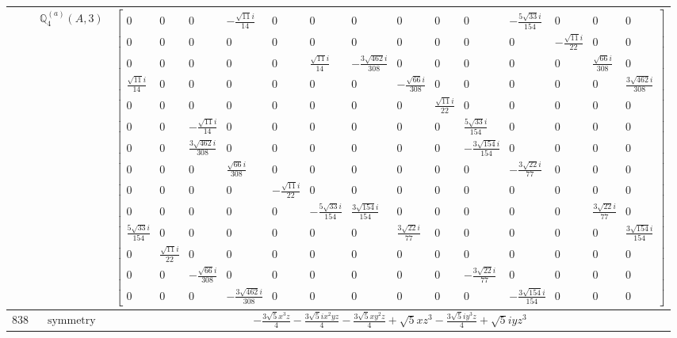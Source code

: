 \documentclass[fleqn,8pt,landscape]{jsarticle}
\begin{document}
\begin{longtable}{ccc}
$  $ & $ \mathbb{Q}_{4}^{(a)}(A,3) $ & $ \begin{bmatrix} 0 & 0 & 0 & - \frac{\sqrt{11} i}{14} & 0 & 0 & 0 & 0 & 0 & 0 & - \frac{5 \sqrt{33} i}{154} & 0 & 0 & 0 \\ 0 & 0 & 0 & 0 & 0 & 0 & 0 & 0 & 0 & 0 & 0 & - \frac{\sqrt{11} i}{22} & 0 & 0 \\ 0 & 0 & 0 & 0 & 0 & \frac{\sqrt{11} i}{14} & - \frac{3 \sqrt{462} i}{308} & 0 & 0 & 0 & 0 & 0 & \frac{\sqrt{66} i}{308} & 0 \\ \frac{\sqrt{11} i}{14} & 0 & 0 & 0 & 0 & 0 & 0 & - \frac{\sqrt{66} i}{308} & 0 & 0 & 0 & 0 & 0 & \frac{3 \sqrt{462} i}{308} \\ 0 & 0 & 0 & 0 & 0 & 0 & 0 & 0 & \frac{\sqrt{11} i}{22} & 0 & 0 & 0 & 0 & 0 \\ 0 & 0 & - \frac{\sqrt{11} i}{14} & 0 & 0 & 0 & 0 & 0 & 0 & \frac{5 \sqrt{33} i}{154} & 0 & 0 & 0 & 0 \\ 0 & 0 & \frac{3 \sqrt{462} i}{308} & 0 & 0 & 0 & 0 & 0 & 0 & - \frac{3 \sqrt{154} i}{154} & 0 & 0 & 0 & 0 \\ 0 & 0 & 0 & \frac{\sqrt{66} i}{308} & 0 & 0 & 0 & 0 & 0 & 0 & - \frac{3 \sqrt{22} i}{77} & 0 & 0 & 0 \\ 0 & 0 & 0 & 0 & - \frac{\sqrt{11} i}{22} & 0 & 0 & 0 & 0 & 0 & 0 & 0 & 0 & 0 \\ 0 & 0 & 0 & 0 & 0 & - \frac{5 \sqrt{33} i}{154} & \frac{3 \sqrt{154} i}{154} & 0 & 0 & 0 & 0 & 0 & \frac{3 \sqrt{22} i}{77} & 0 \\ \frac{5 \sqrt{33} i}{154} & 0 & 0 & 0 & 0 & 0 & 0 & \frac{3 \sqrt{22} i}{77} & 0 & 0 & 0 & 0 & 0 & \frac{3 \sqrt{154} i}{154} \\ 0 & \frac{\sqrt{11} i}{22} & 0 & 0 & 0 & 0 & 0 & 0 & 0 & 0 & 0 & 0 & 0 & 0 \\ 0 & 0 & - \frac{\sqrt{66} i}{308} & 0 & 0 & 0 & 0 & 0 & 0 & - \frac{3 \sqrt{22} i}{77} & 0 & 0 & 0 & 0 \\ 0 & 0 & 0 & - \frac{3 \sqrt{462} i}{308} & 0 & 0 & 0 & 0 & 0 & 0 & - \frac{3 \sqrt{154} i}{154} & 0 & 0 & 0 \end{bmatrix} $ \\ \hline
$ 838 $ & $ \text{symmetry} $ & $ - \frac{3 \sqrt{5} x^{3} z}{4} - \frac{3 \sqrt{5} i x^{2} y z}{4} - \frac{3 \sqrt{5} x y^{2} z}{4} + \sqrt{5} x z^{3} - \frac{3 \sqrt{5} i y^{3} z}{4} + \sqrt{5} i y z^{3} $ \\

\end{longtable}
\end{document}
